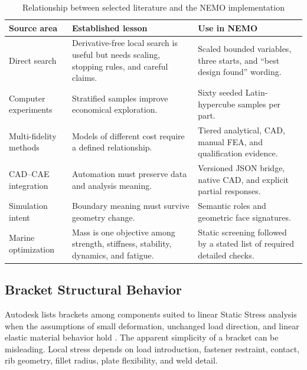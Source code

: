 \begin{table}[H]
\centering
\caption{Relationship between selected literature and the NEMO implementation}
\label{tab:literature-comparison}
\begin{tabularx}{\textwidth}{p{}XX}
\toprule
\textbf{Source area} & \textbf{Established lesson} & \textbf{Use in NEMO}\\
\midrule
Direct search \cite{kolda2003,nelder1965,lagarias1998} &
Derivative-free local search is useful but needs scaling, stopping rules, and
careful claims. &
Scaled bounded variables, three starts, and ``best design found'' wording.\\

Computer experiments \cite{mckay1979} &
Stratified samples improve economical exploration. &
Sixty seeded Latin-hypercube samples per part.\\

Multi-fidelity methods \cite{peherstorfer2018} &
Models of different cost require a defined relationship. &
Tiered analytical, CAD, manual FEA, and qualification evidence.\\

CAD--CAE integration \cite{park2010,li2023} &
Automation must preserve data and analysis meaning. &
Versioned JSON bridge, native CAD, and explicit partial responses.\\

Simulation intent \cite{nolan2015} &
Boundary meaning must survive geometry change. &
Semantic roles and geometric face signatures.\\

Marine optimization \cite{gentils2017,zheng2023,wang2024} &
Mass is one objective among strength, stiffness, stability, dynamics, and
fatigue. &
Static screening followed by a stated list of required detailed checks.\\
\bottomrule
\end{tabularx}
\end{table}

\subsection{Bracket Structural Behavior}
\label{sec:bracket-review}

Autodesk lists brackets among components suited to linear Static Stress
analysis when the assumptions of small deformation, unchanged load direction,
and linear elastic material behavior hold \cite{autodeskStaticStress}. The
apparent simplicity of a bracket can be misleading. Local stress depends on
load introduction, fastener restraint, contact, rib geometry, fillet radius,
plate flexibility, and weld detail.

